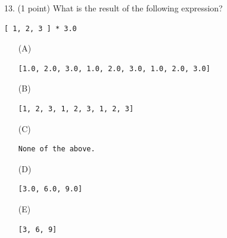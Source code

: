 \documentclass{article}
\begin{document}
\noindent
\begin{minipage}{\textwidth}
13. (1 point)
What is the result of the following expression?
\begin{verbatim}
[ 1, 2, 3 ] * 3.0
\end{verbatim}

\begin{enumerate}
\item[(A)]
\begin{verbatim}[1.0, 2.0, 3.0, 1.0, 2.0, 3.0, 1.0, 2.0, 3.0]\end{verbatim}

\item[(B)]
\begin{verbatim}[1, 2, 3, 1, 2, 3, 1, 2, 3]\end{verbatim}

\item[(C)]
\begin{verbatim}None of the above.\end{verbatim}

\item[(D)]
\begin{verbatim}[3.0, 6.0, 9.0]\end{verbatim}

\item[(E)]
\begin{verbatim}[3, 6, 9]\end{verbatim}

\end{enumerate}
\end{minipage}
\vspace{2em}
\filbreak\vfil{}\vfilneg
\end{document}
